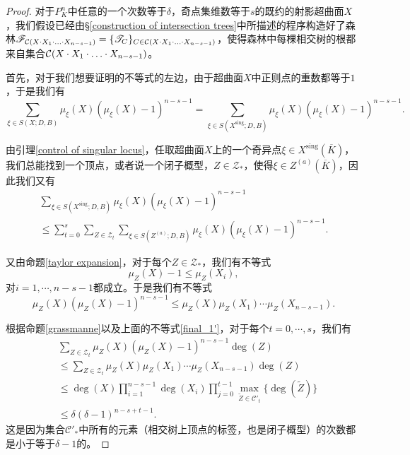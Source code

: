 \begin{proof}
对于$P^n_K$中任意的一个次数等于$\delta$，奇点集维数等于$s$的既约的射影超曲面$X$，我们假设已经由\S \ref{construction of intersection trees}中所描述的程序构造好了森林$\mathscr{F}_{\mathcal C(X\cdot X_{1}\cdot\ldots\cdot X_{n-s-1})} = \{\mathscr T_C\}_{C\in\mathcal C(X\cdot X_{1}\cdot\ldots\cdot X_{n-s-1})}$，使得森林中每棵相交树的根都来自集合$\mathcal C(X\cdot X_{1}\cdot\ldots\cdot X_{n-s-1})$。

首先，对于我们想要证明的不等式的左边，由于超曲面$X$中正则点的重数都等于$1$，于是我们有
\begin{equation} \label{first step}
\sum\limits_{\xi\in S(X;D,B)} \mu_\xi(X)(\mu_\xi(X)-1)^{n-s-1} = \sum\limits_{\xi\in S(X^\mathrm{sing};D,B)} \mu_\xi(X)(\mu_\xi(X)-1)^{n-s-1}.
\end{equation}

由引理\ref{control of singular locus}，任取超曲面$X$上的一个奇异点$\xi\in X^{\mathrm{sing}}(\overline K)$，我们总能找到一个顶点，或者说一个闭子概型，$Z\in\mathcal{Z}_*$，使得$\xi\in Z^{(a)}(\overline K)$，因此我们又有
\begin{multline} \label{final 1}
\sum\limits_{\xi\in S(X^\mathrm{sing};D,B)} \mu_\xi(X)(\mu_\xi(X)-1)^{n-s-1}\\
\leqslant \sum_{t=0}^{s} \sum_{Z\in\mathcal Z_t} \sum_{\xi\in S(Z^{(a)};D,B)} \mu_\xi(X)(\mu_\xi(X)-1)^{n-s-1}.
\end{multline}

又由命题\ref{taylor expansion}，对于每个$Z\in\mathcal Z_*$，我们有不等式
\begin{equation}
\mu_Z(X)-1\leqslant\mu_Z(X_i),
\end{equation}
对$i=1,\cdots,n-s-1$都成立。于是我们有不等式
\begin{equation} \label{final_1'}
\mu_Z(X)(\mu_Z(X)-1)^{n-s-1} \leqslant \mu_Z(X)\mu_Z(X_{1})\cdots\mu_Z(X_{n-s-1}).
\end{equation}

根据命题\ref{grassmanne}以及上面的不等式\eqref{final_1'}，对于每个$t=0,\cdots,s$，我们有
\begin{align} \label{final 2}
& \sum_{Z\in\mathcal Z_t} \mu_Z(X)(\mu_Z(X)-1)^{n-s-1}\deg(Z) \nonumber \\
& \leqslant \sum_{Z\in\mathcal Z_t} \mu_Z(X)\mu_Z(X_{1})\cdots\mu_Z( X_{n-s-1})\deg(Z) \\
& \leqslant \deg(X)\prod_{i=1}^{n-s-1}\deg(X_i)\prod_{j=0}^{t-1}\max_{\widetilde{Z}\in \mathcal C'_t}\{\deg(\widetilde{Z})\} \\
& \leqslant \delta(\delta-1)^{n-s+t-1}.
\end{align}
这是因为集合$\mathcal C'_*$中所有的元素（相交树上顶点的标签，也是闭子概型）的次数都是小于等于$\delta-1$的。


\end{proof}
